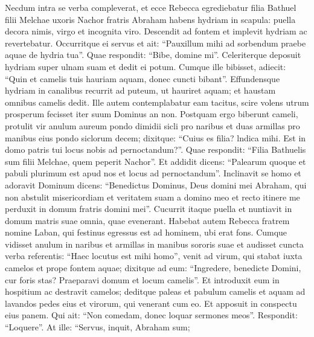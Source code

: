 \begin{biblechapter}
\begin{biblechapter}
\begin{biblechapter}
\begin{biblechapter}
\begin{biblechapter}
\begin{biblechapter}
\begin{biblechapter}
\begin{biblechapter}
\begin{biblechapter}
\begin{biblechapter}
\begin{biblechapter}
\begin{biblechapter}
\begin{biblechapter}
\begin{biblechapter}
\begin{biblechapter}
\begin{biblechapter}
\begin{biblechapter}
\begin{biblechapter}
\begin{biblechapter}
\begin{biblechapter}
\begin{biblechapter}
\begin{biblechapter}
\begin{biblechapter}
\begin{biblechapter}
 \verse Necdum intra se verba compleverat, et ecce Rebecca egrediebatur filia Bathuel filii Melchae uxoris Nachor fratris Abraham habens hydriam in scapula: 
\verse puella decora nimis, virgo et incognita viro. Descendit ad fontem et implevit hydriam ac revertebatur. 
\verse Occurritque ei servus et ait: “Pauxillum mihi ad sorbendum praebe aquae de hydria tua”. 
\verse Quae respondit: “Bibe, domine mi”. Celeriterque deposuit hydriam super ulnam suam et dedit ei potum. 
\verse Cumque ille bibisset, adiecit: “Quin et camelis tuis hauriam aquam, donec cuncti bibant”. 
\verse Effundensque hydriam in canalibus recurrit ad puteum, ut hauriret aquam; et haustam omnibus camelis dedit. 
\verse Ille autem contemplabatur eam tacitus, scire volens utrum prosperum fecisset iter suum Dominus an non.
 \verse Postquam ergo biberunt cameli, protulit vir anulum aureum pondo dimidii sicli pro naribus et duas armillas pro manibus eius pondo siclorum decem; 
\verse dixitque: “Cuius es filia? lndica mihi. Est in domo patris tui locus nobis ad pernoctandum?”. 
\verse Quae respondit: “Filia Bathuelis sum filii Melchae, quem peperit Nachor”. 
\verse Et addidit dicens: “Palearum quoque et pabuli plurimum est apud nos et locus ad pernoctandum”.
 \verse Inclinavit se homo et adoravit Dominum 
\verse dicens: “Benedictus Dominus, Deus domini mei Abraham, qui non abstulit misericordiam et veritatem suam a domino meo et recto itinere me perduxit in domum fratris domini mei”.
 \verse Cucurrit itaque puella et nuntiavit in domum matris suae omnia, quae evenerant.
 \verse Habebat autem Rebecca fratrem nomine Laban, qui festinus egressus est ad hominem, ubi erat fons. 
\verse Cumque vidisset anulum in naribus et armillas in manibus sororis suae et audisset cuncta verba referentis: “Haec locutus est mihi homo”, venit ad virum, qui stabat iuxta camelos et prope fontem aquae; 
\verse dixitque ad eum: “Ingredere, benedicte Domini, cur foris stas? Praeparavi domum et locum camelis”. 
\verse Et introduxit eum in hospitium ac destravit camelos; deditque paleas et pabulum camelis et aquam ad lavandos pedes eius et virorum, qui venerant cum eo. 
\verse Et apposuit in conspectu eius panem. Qui ait: “Non comedam, donec loquar sermones meos”. Respondit: “Loquere”.
 \verse At ille: “Servus, inquit, Abraham sum; 

\end{biblechapter}
\end{biblechapter}
\end{biblechapter}
\end{biblechapter}
\end{biblechapter}
\end{biblechapter}
\end{biblechapter}
\end{biblechapter}
\end{biblechapter}
\end{biblechapter}
\end{biblechapter}
\end{biblechapter}
\end{biblechapter}
\end{biblechapter}
\end{biblechapter}
\end{biblechapter}
\end{biblechapter}
\end{biblechapter}
\end{biblechapter}
\end{biblechapter}
\end{biblechapter}
\end{biblechapter}
\end{biblechapter}
\end{biblechapter}
